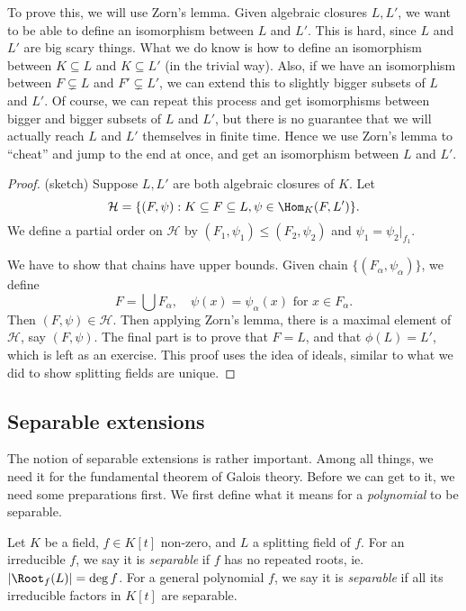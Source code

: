 \documentclass[a4paper]{article}
\begin{document}
To prove this, we will use Zorn's lemma. Given algebraic closures $L, L'$, we want to be able to define an isomorphism between $L$ and $L'$. This is hard, since $L$ and $L'$ are big scary things. What we do know is how to define an isomorphism between $K\subseteq L$ and $K\subseteq L'$ (in the trivial way). Also, if we have an isomorphism between $F\subsetneq L$ and $F'\subsetneq L'$, we can extend this to slightly bigger subsets of $L$ and $L'$. Of course, we can repeat this process and get isomorphisms between bigger and bigger subsets of $L$ and $L'$, but there is no guarantee that we will actually reach $L$ and $L'$ themselves in finite time. Hence we use Zorn's lemma to ``cheat'' and jump to the end at once, and get an isomorphism between $L$ and $L'$.

\begin{proof}(sketch)
  Suppose $L, L'$ are both algebraic closures of $K$. Let
  \[
    \mathcal{H} = \{(F, \psi): K\subseteq F\subseteq L, \psi \in \Hom_K(F, L')\}.
  \]
  We define a partial order on $\mathcal{H}$ by $(F_1, \psi_1) \leq (F_2, \psi_2)$ and $\psi_1= \psi_2|_{f_1}$.

  We have to show that chains have upper bounds. Given chain $\{(F_\alpha, \psi_\alpha)\}$, we define
  \[
    F = \bigcup F_\alpha,\quad \psi(x) = \psi_\alpha(x)\text{ for }x \in F_\alpha.
  \]
  Then $(F, \psi) \in \mathcal{H}$. Then applying Zorn's lemma, there is a maximal element of $\mathcal{H}$, say $(F, \psi)$. The final part is to prove that $F = L$, and that $\phi(L) = L'$, which is left as an exercise. This proof uses the idea of ideals, similar to what we did to show splitting fields are unique.
\end{proof}

\subsection{Separable extensions}
The notion of separable extensions is rather important. Among all things, we need it for the fundamental theorem of Galois theory. Before we can get to it, we need some preparations first. We first define what it means for a \emph{polynomial} to be separable.

\begin{defi}
  Let $K$ be a field, $f\in K[t]$ non-zero, and $L$ a splitting field of $f$. For an irreducible $f$, we say it is \emph{separable} if $f$ has no repeated roots, ie. $|\Root_f(L)| = \deg f$. For a general polynomial $f$, we say it is \emph{separable} if all its irreducible factors in $K[t]$ are separable.
\end{defi}
\end{document}
